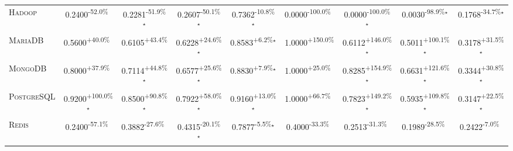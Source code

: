 \begin{table}[htbp]
\begin{tabular}{l|cccc|cccc}
\textsc{Hadoop} & \cellcolor{red!30}0.2400\textsuperscript{-52.0\%}$^{\,\,\,}$ & \cellcolor{red!30}0.2281\textsuperscript{-51.9\%}$^\star$ & \cellcolor{red!30}0.2607\textsuperscript{-50.1\%}$^\star$ & \cellcolor{red!30}0.7362\textsuperscript{-10.8\%}$^\star$ & \cellcolor{red!30}0.0000\textsuperscript{-100.0\%}$^{\,\,\,}$ & \cellcolor{red!30}0.0000\textsuperscript{-100.0\%}$^\star$ & \cellcolor{red!30}0.0030\textsuperscript{-98.9\%}$^\star$ & \cellcolor{red!30}0.1768\textsuperscript{-34.7\%}$^\star$ \\
\textsc{MariaDB} & \cellcolor{green!30}0.5600\textsuperscript{+40.0\%}$^{\,\,\,}$ & \cellcolor{green!30}0.6105\textsuperscript{+43.4\%}$^{\,\,\,}$ & \cellcolor{green!30}0.6228\textsuperscript{+24.6\%}$^\star$ & \cellcolor{green!30}0.8583\textsuperscript{+6.2\%}$^\star$ & \cellcolor{green!30}1.0000\textsuperscript{+150.0\%}$^{\,\,\,}$ & \cellcolor{green!30}0.6112\textsuperscript{+146.0\%}$^\star$ & \cellcolor{green!30}0.5011\textsuperscript{+100.1\%}$^\star$ & \cellcolor{green!30}0.3178\textsuperscript{+31.5\%}$^\star$ \\
\textsc{MongoDB} & \cellcolor{green!30}0.8000\textsuperscript{+37.9\%}$^{\,\,\,}$ & \cellcolor{green!30}0.7114\textsuperscript{+44.8\%}$^\star$ & \cellcolor{green!30}0.6577\textsuperscript{+25.6\%}$^\star$ & \cellcolor{green!30}0.8830\textsuperscript{+7.9\%}$^\star$ & \cellcolor{green!30}1.0000\textsuperscript{+25.0\%}$^{\,\,\,}$ & \cellcolor{green!30}0.8285\textsuperscript{+154.9\%}$^\star$ & \cellcolor{green!30}0.6631\textsuperscript{+121.6\%}$^\star$ & \cellcolor{green!30}0.3344\textsuperscript{+30.8\%}$^\star$ \\
\textsc{PostgreSQL} & \cellcolor{green!30}0.9200\textsuperscript{+100.0\%}$^\star$ & \cellcolor{green!30}0.8500\textsuperscript{+90.8\%}$^\star$ & \cellcolor{green!30}0.7922\textsuperscript{+58.0\%}$^\star$ & \cellcolor{green!30}0.9160\textsuperscript{+13.0\%}$^\star$ & \cellcolor{green!30}1.0000\textsuperscript{+66.7\%}$^{\,\,\,}$ & \cellcolor{green!30}0.7823\textsuperscript{+149.2\%}$^\star$ & \cellcolor{green!30}0.5935\textsuperscript{+109.8\%}$^\star$ & \cellcolor{green!30}0.3147\textsuperscript{+22.5\%}$^\star$ \\
\textsc{Redis} & \cellcolor{red!30}0.2400\textsuperscript{-57.1\%}$^{\,\,\,}$ & \cellcolor{red!30}0.3882\textsuperscript{-27.6\%}$^{\,\,\,}$ & \cellcolor{red!30}0.4315\textsuperscript{-20.1\%}$^\star$ & \cellcolor{red!30}0.7877\textsuperscript{-5.5\%}$^\star$ & \cellcolor{red!30}0.4000\textsuperscript{-33.3\%}$^{\,\,\,}$ & \cellcolor{red!30}0.2513\textsuperscript{-31.3\%}$^{\,\,\,}$ & \cellcolor{red!30}0.1989\textsuperscript{-28.5\%}$^{\,\,\,}$ & \cellcolor{red!30}0.2422\textsuperscript{-7.0\%}$^{\,\,\,}$ \\

\end{tabular}
\end{table}
